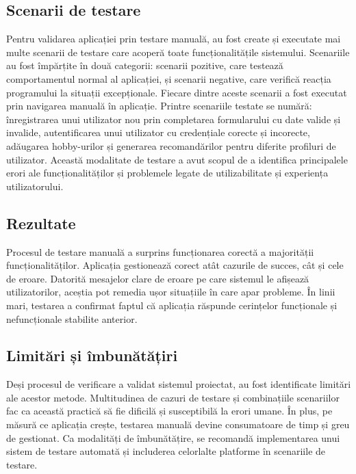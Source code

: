 \subsection{Scenarii de testare}
\label{subsec:ch4sec4sub2}
Pentru validarea aplicației prin testare manuală, au fost create și executate mai multe scenarii de testare care acoperă toate funcționalitățile sistemului.
Scenariile au fost împărțite în două categorii: scenarii pozitive, care testează comportamentul normal al aplicației, și scenarii negative, care verifică reacția programului la situații excepționale.
Fiecare dintre aceste scenarii a fost executat prin navigarea manuală în aplicație.
Printre scenariile testate se numără: înregistrarea unui utilizator nou prin completarea formularului cu date valide și invalide, autentificarea unui utilizator cu credențiale corecte și incorecte, adăugarea hobby-urilor și generarea recomandărilor pentru diferite profiluri de utilizator.
Această modalitate de testare a avut scopul de a identifica principalele erori ale funcționalităților și problemele legate de utilizabilitate și experiența utilizatorului.

\subsection{Rezultate}
\label{subsec:ch4sec4sub3}
Procesul de testare manuală a surprins funcționarea corectă a majorității funcționalităților.
Aplicația gestionează corect atât cazurile de succes, cât și cele de eroare.
Datorită mesajelor clare de eroare pe care sistemul le afișează utilizatorilor, aceștia pot remedia ușor situațiile în care apar probleme.
În linii mari, testarea a confirmat faptul că aplicația răspunde cerințelor funcționale și nefuncționale stabilite anterior.

\subsection{Limitări și îmbunătățiri}
\label{subsec:ch4sec4sub4}
Deși procesul de verificare a validat sistemul proiectat, au fost identificate limitări ale acestor metode.
Multitudinea de cazuri de testare și combinațiile scenariilor fac ca această practică să fie dificilă și susceptibilă la erori umane.
În plus, pe măsură ce aplicația crește, testarea manuală devine consumatoare de timp și greu de gestionat.
Ca modalități de îmbunătățire, se recomandă implementarea unui sistem de testare automată și includerea celorlalte platforme în scenariile de testare.